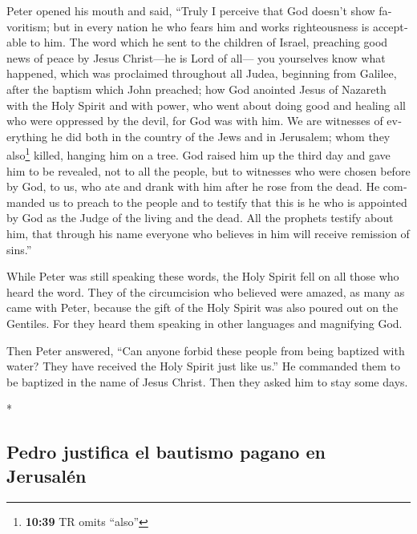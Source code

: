 \begin{paracol}{2}
\begin{otherlanguage}{english}
 Peter opened his mouth and said, ``Truly I perceive that
God doesn't show favoritism;  but in every nation he who
fears him and works righteousness is acceptable to him. 
The word which he sent to the children of Israel, preaching good news of
peace by Jesus Christ---he is Lord of all---  you
yourselves know what happened, which was proclaimed throughout all
Judea, beginning from Galilee, after the baptism which John preached;
 how God anointed Jesus of Nazareth with the Holy Spirit
and with power, who went about doing good and healing all who were
oppressed by the devil, for God was with him.  We are
witnesses of everything he did both in the country of the Jews and in
Jerusalem; whom they also\footnote{\textbf{10:39} TR omits ``also''}
killed, hanging him on a tree.  God raised him up the
third day and gave him to be revealed,  not to all the
people, but to witnesses who were chosen before by God, to us, who ate
and drank with him after he rose from the dead.  He
commanded us to preach to the people and to testify that this is he who
is appointed by God as the Judge of the living and the dead.
 All the prophets testify about him, that through his
name everyone who believes in him will receive remission of sins.''

 While Peter was still speaking these words, the Holy
Spirit fell on all those who heard the word.  They of the
circumcision who believed were amazed, as many as came with Peter,
because the gift of the Holy Spirit was also poured out on the Gentiles.
 For they heard them speaking in other languages and
magnifying God.

Then Peter answered,  ``Can anyone forbid these people
from being baptized with water? They have received the Holy Spirit just
like us.''  He commanded them to be baptized in the name
of Jesus Christ. Then they asked him to stay some days.

\end{otherlanguage}

\switchcolumn[0]*

\hypertarget{pedro-justifica-el-bautismo-pagano-en-jerusaluxe9n}{%
\subsection{Pedro justifica el bautismo pagano en
Jerusalén}\label{pedro-justifica-el-bautismo-pagano-en-jerusaluxe9n}}


\end{paracol}
